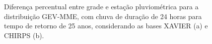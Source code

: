 \documentclass[
]{agujournal2019}
\begin{document}
\begin{figure}

\begin{minipage}{\linewidth}



\end{minipage}%
\newline
\begin{minipage}{\linewidth}



\end{minipage}%

\caption{\label{fig-Figura23}Diferença percentual entre grade e estação
pluviométrica para a distribuição GEV-MME, com chuva de duração de 24
horas para tempo de retorno de 25 anos, considerando as bases XAVIER (a)
e CHIRPS (b).}

\end{figure}%
\end{document}
